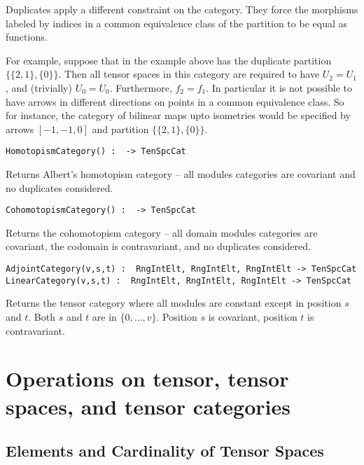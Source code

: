 \documentclass{amsart}
\begin{document}
Duplicates apply a different constraint on the category.  They force the 
morphisms labeled by indices in a common equivalence class of the partition to 
be equal as functions.  

For example, suppose that in the example above has the duplicate partition 
$\{\{2,1\},\{0\}\}$. Then all tensor spaces in this category are required to 
have $U_2=U_1$, and (trivially) $U_0=U_0$. Furthermore, $f_2=f_1$. In particular
it is not possible to have arrows in different directions on points in a common 
equivalence class.  So for instance, the category of bilinear maps upto 
isometries would be specified by arrows $[-1,-1,0]$ and partition 
$\{\{2,1\},\{0\}\}$.

\color{blue}
{\small \begin{verbatim}
HomotopismCategory() :  -> TenSpcCat
\end{verbatim} }
\color{black}

Returns Albert's homotopism category -- all modules categories are covariant and 
no duplicates considered.

\color{blue}
{\small \begin{verbatim}
CohomotopismCategory() :  -> TenSpcCat
\end{verbatim} }
\color{black}

Returns the cohomotopism category -- all domain modules categories are 
covariant, the codomain is contravariant, and no duplicates considered.

\color{blue}
{\small \begin{verbatim}
AdjointCategory(v,s,t) :  RngIntElt, RngIntElt, RngIntElt -> TenSpcCat
LinearCategory(v,s,t) :  RngIntElt, RngIntElt, RngIntElt -> TenSpcCat
\end{verbatim} }
\color{black}

Returns the tensor category where all modules are constant except in position 
$s$ and $t$.  Both $s$ and $t$ are in $\{0,\dots, v\}$.
Position $s$ is covariant, position $t$ is contravariant.


\section{Operations on tensor, tensor spaces, and tensor categories}

\subsection{Elements and Cardinality of Tensor Spaces}
\end{document}
